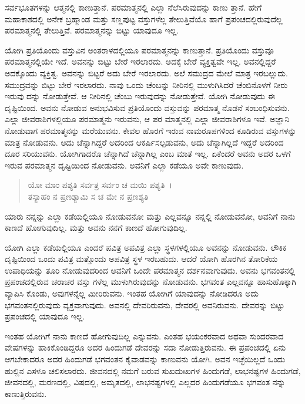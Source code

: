 ಸರ್ವಭೂತಗಳನ್ನು ಆತ್ಮನಲ್ಲಿ ಕಾಣುತ್ತಾನೆ. ಪರಮಾತ್ಮನಲ್ಲಿ ಎಲ್ಲಾ ನೆಲೆಸಿರುವುದನ್ನು ಕಾಣು ತ್ತಾನೆ. ಹೇಗೆ ಮಹಾಕಾಶದಲ್ಲಿ ಅನೇಕ ಬ್ರಹ್ಮಾಂಡ ಮತ್ತು ಸಣ್ಣಪುಟ್ಟ ವಸ್ತುಗಳೆಲ್ಲ ತೇಲುತ್ತಿವೆಯೊ ಹಾಗೆ ಪ್ರಪಂಚದಲ್ಲಿರುವುದೆಲ್ಲ ಪರಮಾತ್ಮನಲ್ಲಿ ತೇಲುತ್ತಿವೆ. ಪರಮಾತ್ಮನನ್ನು ಬಿಟ್ಟು ಯಾವುದೂ ಇಲ್ಲ.

ಯೋಗಿ ಪ್ರತಿಯೊಂದು ವಸ್ತುವಿನ ಅಂತರಾಳದಲ್ಲಿಯೂ ಪರಮಾತ್ಮನನ್ನು ಕಾಣುತ್ತಾನೆ. ಪ್ರತಿಯೊಂದು ವಸ್ತುವೂ ಪರಮಾತ್ಮನಲ್ಲಿಯೇ ಇದೆ. ಅವನನ್ನು ಬಿಟ್ಟು ಬೇರೆ ಇರಲಾರದು. ಅದಕ್ಕೆ ಬೇರೆ ವ್ಯಕ್ತಿತ್ವವೇ ಇಲ್ಲ. ಅವನಲ್ಲಿದ್ದರೆ ಅದಕ್ಕೊಂದು ವ್ಯಕ್ತಿತ್ವ. ಅವನನ್ನು ಬಿಟ್ಟರೆ ಅದು ಬೇರೆ ಇರಲಾರದು. ಅಲೆ ಸಮುದ್ರದ ಮೇಲೆ ಮಾತ್ರ ಇರಬಲ್ಲುದು. ಸಮುದ್ರವನ್ನು ಬಿಟ್ಟು ಬೇರೆ ಇರಲಾರದು. ನಾವು ಒಂದು ಚೆಂಬನ್ನು ನೀರಿನಲ್ಲಿ ಮುಳುಗಿಸಿದರೆ ಚೆಂಬಿನೊಳಗೆ ನೀರು ಇರುವು ದನ್ನು ನೋಡುತ್ತೇವೆ. ಆ ನೀರಿನಲ್ಲಿ ಚೆಂಬು ಇರುವುದನ್ನು ನೋಡುತ್ತೇವೆ. ಯೋಗಿ ನೋಡುವುದು ಈ ದೃಷ್ಟಿಯಿಂದ. ಅವನು ನೋಡುವ ಅನುಭವಿಸುವ ಪ್ರತಿಯೊಂದು ವಸ್ತುವನ್ನು ಪರಮಾತ್ಮ ನೊಡನೆ ಸಂಬಂಧಿಸುವನು. ಎಲ್ಲಾ ಜೀವರಾಶಿಗಳಲ್ಲಿಯೂ ಪರಮಾತ್ಮನು ಇರುವನು, ಆ ಪರ ಮಾತ್ಮನಲ್ಲಿ ಎಲ್ಲಾ ಜೀವರಾಶಿಗಳೂ ಇವೆ. ಅಜ್ಞಾನಿ ನೋಡುವಾಗ ಪರಮಾತ್ಮನನ್ನು ಮರೆಯುವನು. ಕೇವಲ ಹೊರಗೆ ಇರುವ ನಾಮರೂಪಗಳಿಂದ ಕೂಡಿರುವ ವಸ್ತುಗಳನ್ನು ಮಾತ್ರ ನೋಡುವನು. ಅದು ಚೆನ್ನಾಗಿದ್ದರೆ ಅದರಿಂದ ಆಕರ್ಷಿಸಲ್ಪಡುವನು, ಅದು ಚೆನ್ನಾಗಿಲ್ಲದೆ ಇದ್ದರೆ ಅದರಿಂದ ದೂರ ಸರಿಯುವನು. ಯೋಗಿಗಾದರೊ ಚೆನ್ನಾಗಿದೆ ಚೆನ್ನಾಗಿಲ್ಲ ಎಂಬ ಮಾತೆ ಇಲ್ಲ. ಏಕೆಂದರೆ ಅವನು ಅದರ ಒಳಗೆ ಇರುವ ಪರಮಾತ್ಮನ ದೃಷ್ಟಿಯಿಂದ ನೋಡುವನು. ಅವನಿಗೆ ಎಲ್ಲಾ ಕಡೆಯೂ ಅವೇ ಕಾಣುವುದು.

\begin{verse}
ಯೋ ಮಾಂ ಪಶ್ಯತಿ ಸರ್ವತ್ರ ಸರ್ವಂ ಚ ಮಯಿ ಪಶ್ಯತಿ~।\\ತಸ್ಯಾಹಂ ನ ಪ್ರಣಶ್ಯಾಮಿ ಸ ಚ ಮೇ ನ ಪ್ರಣಶ್ಯತಿ 
\end{verse}

{\small ಯಾರು ನನ್ನನ್ನು ಎಲ್ಲಾ ಕಡೆಯಲ್ಲಿಯೂ ನೋಡುವನೋ ಮತ್ತು ಎಲ್ಲವನ್ನೂ ನನ್ನಲ್ಲಿ ನೋಡುವನೋ, ಅವನಿಗೆ ನಾನು ಕಾಣದೆ ಹೋಗುವುದಿಲ್ಲ. ಮತ್ತು ಅವನು ನನಗೆ ಕಾಣದೆ ಹೋಗುವುದಿಲ್ಲ.}

ಯೋಗಿ ಎಲ್ಲಾ ಕಡೆಯಲ್ಲಿಯೂ ಎಂದರೆ ಪವಿತ್ರ ಅಪವಿತ್ರ ಎಲ್ಲಾ ಸ್ಥಳಗಳಲ್ಲಿಯೂ ಅವನನ್ನು ನೋಡುವನು. ಲೌಕಿಕ ದೃಷ್ಟಿಯಿಂದ ಒಂದು ಪವಿತ್ರ ಮತ್ತೊಂದು ಅಪವಿತ್ರ ಸ್ಥಳ ಇರಬಹುದು. ಆದರೆ ಯೋಗಿ ಹೊರಗಿನ ತೋರಿಕೆಯ ಉಪಾಧಿಯನ್ನು ತೂರಿ ನೋಡುವುದರಿಂದ ಅವನಿಗೆ ಒಂದೇ ಪರಮಾತ್ಮನ ದರ್ಶನವಾಗುವುದು. ಅವನು ಭಗವಂತನಲ್ಲಿ ಪ್ರಪಂಚದಲ್ಲಿರುವ ಚರಾಚರ ವಸ್ತು ಗಳೆಲ್ಲ ಮುಳುಗಿರುವುದನ್ನು ನೋಡುವನು. ಭಗವಂತ ಎಲ್ಲವನ್ನೂ ಹಾಸುಹೊಕ್ಕಾಗಿ ವ್ಯಾಪಿಸಿ ಕೊಂಡು, ಅವುಗಳನ್ನೆಲ್ಲ ಮೀರಿರುವನು. ಇಂತಹ ಯೋಗಿಗೆ ಯಾವುದನ್ನು ನೋಡಿದರೂ ಅದು ಭಗವಂತನಲ್ಲಿರುವುದು ವ್ಯಕ್ತವಾಗುವುದು. ಅವನಲ್ಲಿ ದೇವರಿರುವನು, ದೇವರಲ್ಲಿ ಅವನಿರುವನು. ದೇವರನ್ನು ಬಿಟ್ಟು ಪ್ರಪಂಚದಲ್ಲಿ ಯಾವುದೂ ಇಲ್ಲ.

ಇಂತಹ ಯೋಗಿಗೆ ನಾನು ಕಾಣದೆ ಹೋಗುವುದಿಲ್ಲ ಎನ್ನುವನು. ಎಂತಹ ಭಯಂಕರವಾದ ಅಥವಾ ಸುಂದರವಾದ ವೇಷಗಳನ್ನು ಹಾಕಿಕೊಂಡಿದ್ದರೂ ಅದರ ಹಿಂದುಗಡೆ ದೇವರನ್ನು ಸದಾ ನೋಡುತ್ತಿರುವನು. ಈ ಪ್ರಪಂಚದಲ್ಲಿ ಏನು ಆಗಬೇಕಾದರೂ ಅದರ ಹಿಂದುಗಡೆ ಭಗವಂತನ ಕೈವಾಡವನ್ನು ಕಾಣುವನು ಯೋಗಿ. ಅವನ ಇಚ್ಛೆಯಿಲ್ಲದೆ ಒಂದು ಹುಲ್ಲಿನ ಎಸಳೂ ಚಲಿಸಲಾರದು. ಜೀವನದಲ್ಲಿ ನಮಗೆ ಬರುವ ಸುಖದುಃಖಗಳ ಹಿಂದುಗಡೆ, ಲಾಭನಷ್ಟಗಳ ಹಿಂದುಗಡೆ, ಜೀವನದಲ್ಲಿ, ಮರಣದಲ್ಲಿ, ವಿಷದಲ್ಲಿ, ಅಮೃತದಲ್ಲಿ, ಲಾಭನಷ್ಟಗಳಲ್ಲಿ ಎಲ್ಲದರ ಹಿಂದುಗಡೆಯೂ ಭಗವಂತ ನನ್ನು ಕಾಣುತ್ತಿರುವನು.

